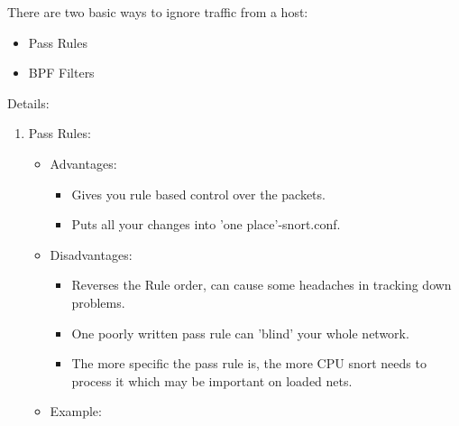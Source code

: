 \documentclass{article}
\begin{document}
There are two basic ways to ignore traffic from a host:
\begin{itemize}
  \item Pass Rules
  \item BPF Filters
\end{itemize}
Details:
\begin{enumerate}
\item  Pass Rules:
      \begin{itemize}
      \item Advantages:
      	\begin{itemize}
         \item Gives you rule based control over the packets.
         \item Puts all your changes into 'one place'-snort.conf.
	\end{itemize}
      \item Disadvantages:
      	\begin{itemize}
        \item Reverses the Rule order, can cause some headaches in tracking down
        problems.
        \item One poorly written pass rule can 'blind' your whole network.
        \item The more specific the pass rule is, the more CPU snort needs to process
        it which may be important on loaded nets.
      \end{itemize}
      \item Example:


\end{itemize}
\end{enumerate}
\end{document}
